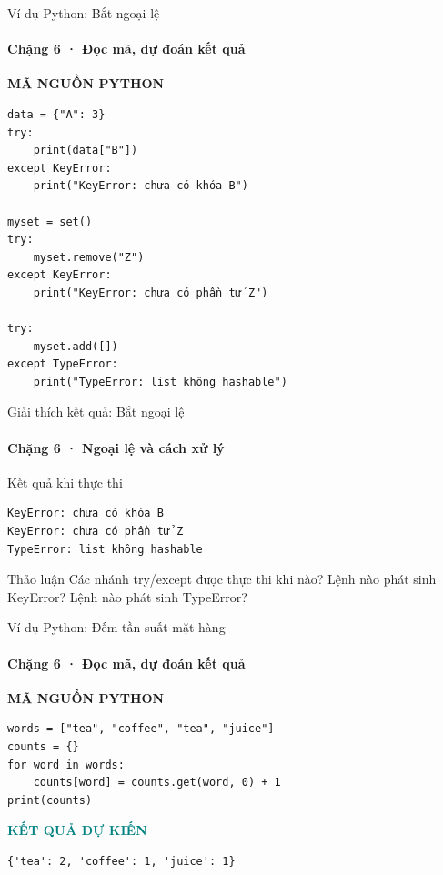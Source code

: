 \documentclass[aspectratio=169,10pt]{beamer}
\begin{document}
\begin{frame}[fragile,t]{Ví dụ Python: Bắt ngoại lệ}
\framesubtitle{Chặng 6 · Đọc mã, dự đoán kết quả}
\vspace{-1mm}
{\small\color{muted}\textbf{MÃ NGUỒN PYTHON}}\par\vspace{1mm}
\begin{Verbatim}[fontsize=\scriptsize,frame=single,framesep=4mm,rulecolor=\color{teal!35},breaklines=true]
data = {"A": 3}
try:
    print(data["B"])
except KeyError:
    print("KeyError: chưa có khóa B")

myset = set()
try:
    myset.remove("Z")
except KeyError:
    print("KeyError: chưa có phần tử Z")

try:
    myset.add([])
except TypeError:
    print("TypeError: list không hashable")
\end{Verbatim}

\end{frame}

\begin{frame}[fragile,t]{Giải thích kết quả: Bắt ngoại lệ}
\framesubtitle{Chặng 6 · Ngoại lệ và cách xử lý}
\begin{block}{Kết quả khi thực thi}
\begin{Verbatim}[fontsize=\footnotesize,breaklines=true]
KeyError: chưa có khóa B
KeyError: chưa có phần tử Z
TypeError: list không hashable
\end{Verbatim}
\end{block}
\begin{block}{Thảo luận} Các nhánh try/except được thực thi khi nào? Lệnh nào phát sinh KeyError? Lệnh nào phát sinh TypeError? \end{block}

\end{frame}

\begin{frame}[fragile,t]{Ví dụ Python: Đếm tần suất mặt hàng}
\framesubtitle{Chặng 6 · Đọc mã, dự đoán kết quả}
\vspace{-1mm}
{\small\color{muted}\textbf{MÃ NGUỒN PYTHON}}\par\vspace{1mm}
\begin{Verbatim}[fontsize=\scriptsize,frame=single,framesep=4mm,rulecolor=\color{teal!35},breaklines=true]
words = ["tea", "coffee", "tea", "juice"]
counts = {}
for word in words:
    counts[word] = counts.get(word, 0) + 1
print(counts)
\end{Verbatim}
\vspace{1mm}\textcolor{teal}{\scriptsize\textbf{KẾT QUẢ DỰ KIẾN}}
\begin{Verbatim}[fontsize=\scriptsize,breaklines=true]
{'tea': 2, 'coffee': 1, 'juice': 1}
\end{Verbatim}

\end{frame}
\end{document}
